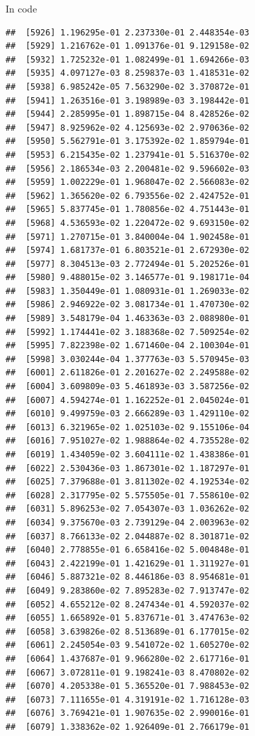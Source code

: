 \documentclass[ignorenonframetext,]{beamer}
\begin{document}
\begin{frame}[fragile]{In code}
\begin{verbatim}
##  [5926] 1.196295e-01 2.237330e-01 2.448354e-03
##  [5929] 1.216762e-01 1.091376e-01 9.129158e-02
##  [5932] 1.725232e-01 1.082499e-01 1.694266e-03
##  [5935] 4.097127e-03 8.259837e-03 1.418531e-02
##  [5938] 6.985242e-05 7.563290e-02 3.370872e-01
##  [5941] 1.263516e-01 3.198989e-03 3.198442e-01
##  [5944] 2.285995e-01 1.898715e-04 8.428526e-02
##  [5947] 8.925962e-02 4.125693e-02 2.970636e-02
##  [5950] 5.562791e-01 3.175392e-02 1.859794e-01
##  [5953] 6.215435e-02 1.237941e-01 5.516370e-02
##  [5956] 2.186534e-03 2.200481e-02 9.596602e-03
##  [5959] 1.002229e-01 1.968047e-02 2.566083e-02
##  [5962] 1.365620e-02 6.793556e-02 2.424752e-01
##  [5965] 5.837745e-01 1.780856e-02 4.751443e-01
##  [5968] 4.536593e-02 1.220472e-02 9.693150e-02
##  [5971] 1.270715e-01 3.840004e-04 1.902458e-01
##  [5974] 1.681737e-01 6.803521e-01 2.672930e-02
##  [5977] 8.304513e-03 2.772494e-01 5.202526e-01
##  [5980] 9.488015e-02 3.146577e-01 9.198171e-04
##  [5983] 1.350449e-01 1.080931e-01 1.269033e-02
##  [5986] 2.946922e-02 3.081734e-01 1.470730e-02
##  [5989] 3.548179e-04 1.463363e-03 2.088980e-01
##  [5992] 1.174441e-02 3.188368e-02 7.509254e-02
##  [5995] 7.822398e-02 1.671460e-04 2.100304e-01
##  [5998] 3.030244e-04 1.377763e-03 5.570945e-03
##  [6001] 2.611826e-01 2.201627e-02 2.249588e-02
##  [6004] 3.609809e-03 5.461893e-03 3.587256e-02
##  [6007] 4.594274e-01 1.162252e-01 2.045024e-01
##  [6010] 9.499759e-03 2.666289e-03 1.429110e-02
##  [6013] 6.321965e-02 1.025103e-02 9.155106e-04
##  [6016] 7.951027e-02 1.988864e-02 4.735528e-02
##  [6019] 1.434059e-02 3.604111e-02 1.438386e-01
##  [6022] 2.530436e-03 1.867301e-02 1.187297e-01
##  [6025] 7.379688e-01 3.811302e-02 4.192534e-02
##  [6028] 2.317795e-02 5.575505e-01 7.558610e-02
##  [6031] 5.896253e-02 7.054307e-03 1.036262e-02
##  [6034] 9.375670e-03 2.739129e-04 2.003963e-02
##  [6037] 8.766133e-02 2.044887e-02 8.301871e-02
##  [6040] 2.778855e-01 6.658416e-02 5.004848e-01
##  [6043] 2.422199e-01 1.421629e-01 1.311927e-01
##  [6046] 5.887321e-02 8.446186e-03 8.954681e-01
##  [6049] 9.283860e-02 7.895283e-02 7.913747e-02
##  [6052] 4.655212e-02 8.247434e-01 4.592037e-02
##  [6055] 1.665892e-01 5.837671e-01 3.474763e-02
##  [6058] 3.639826e-02 8.513689e-01 6.177015e-02
##  [6061] 2.245054e-03 9.541072e-02 1.605270e-02
##  [6064] 1.437687e-01 9.966280e-02 2.617716e-01
##  [6067] 3.072811e-01 9.198241e-03 8.470802e-02
##  [6070] 4.205338e-01 5.365520e-01 7.988453e-02
##  [6073] 7.111655e-01 4.319191e-02 1.716128e-03
##  [6076] 3.769421e-01 1.907635e-02 2.990016e-01
##  [6079] 1.338362e-02 1.926409e-01 2.766179e-01

\end{verbatim}
\end{frame}
\end{document}
